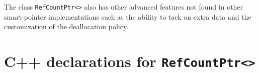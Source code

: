 \documentclass[pdf,ps2pdf,11pt]{SANDreport}
\begin{document}
The class {}\texttt{Ref\-Count\-Ptr<>} also has other advanced
features not found in other smart-pointer implementations such as the
ability to tack on extra data and the customization of the
deallocation policy.

%
\clearpage



%

\appendix

%
\section{C++ declarations for {}\texttt{Ref\-Count\-Ptr<>}}
\label{rcpqs:apdx:c++decl}
%
\end{document}
